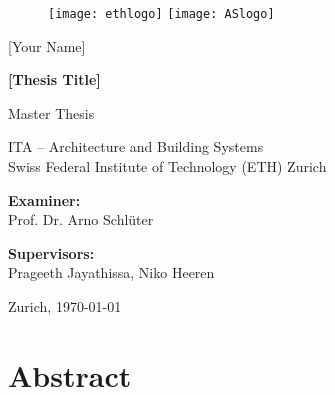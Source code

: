 
\frontmatter
\hypersetup{pageanchor=false}
\begin{titlepage}

\begin{center}

\begin{figure}[!ht]
\texttt{[image: ethlogo]}
\hfill
\texttt{[image: ASlogo]}
\end{figure}

\vspace{30mm} 

[Your Name] \\

\vspace{10mm} 
\begin{doublespace}
\textbf{\LARGE [Thesis Title]} \\
\end{doublespace}

\vspace{10mm} 

Master Thesis \\ 


\vfill

ITA -- Architecture and Building Systems\\ 
Swiss Federal Institute of Technology (ETH) Zurich \\

\vspace{5mm}

\textbf{Examiner:}\\ 
Prof. Dr. Arno Schl\"uter\\

\vspace{5mm} 

\textbf{Supervisors:} \\
Prageeth Jayathissa, Niko Heeren 

\vspace{5mm} Zurich, \today

\end{center}
\end{titlepage}
\hypersetup{pageanchor=true}


\chapter*{Abstract}





